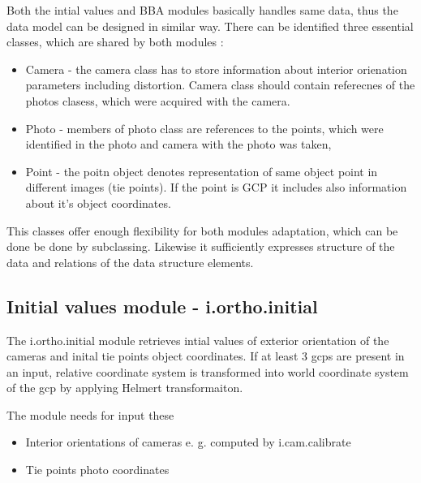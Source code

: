 \documentclass[a4paper,12pt]{report}
\begin{document}
Both the intial values and BBA modules basically handles  same data, thus 
the data model can be designed in similar way. There can be 
identified three essential classes, which are shared by both modules :
\begin{itemize}
\item Camera - the camera class has to store information about interior orienation 
parameters including distortion. Camera class should contain referecnes of the photos
clasess, which were acquired with the camera.
\item Photo - members of photo class are references to the points, which were identified 
	    in the photo and camera with the photo was taken,
\item Point - the poitn object denotes representation of same object point in different images (tie points).
 If the point is GCP it includes also information about it's object coordinates. 
\end{itemize}


This classes offer enough flexibility for both modules adaptation, which can be done be done by subclassing. 
Likewise it sufficiently expresses  structure of the data and relations of the data structure elements.

\subsection{Initial values module - i.ortho.initial}

The i.ortho.initial module retrieves intial values of exterior orientation of the cameras and inital tie points object coordinates. If at least 3 gcps are 
present in an input, relative coordinate system is transformed into world coordinate system of the gcp by applying Helmert transformaiton. 


The module needs for input these 
\begin{itemize}
\item Interior orientations of cameras e. g. computed by i.cam.calibrate
\item Tie points photo coordinates 
\end{itemize}
\end{document}
